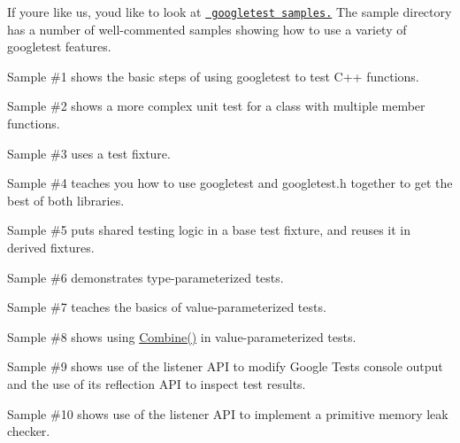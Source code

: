 If you\textquotesingle{}re like us, you\textquotesingle{}d like to look at \href{https://github.com/google/googletest/tree/master/googletest/samples}{\texttt{ googletest samples.}} The sample directory has a number of well-\/commented samples showing how to use a variety of googletest features.


\begin{DoxyItemize}
\item Sample \#1 shows the basic steps of using googletest to test C++ functions.
\item Sample \#2 shows a more complex unit test for a class with multiple member functions.
\item Sample \#3 uses a test fixture.
\item Sample \#4 teaches you how to use googletest and {\ttfamily googletest.\+h} together to get the best of both libraries.
\item Sample \#5 puts shared testing logic in a base test fixture, and reuses it in derived fixtures.
\item Sample \#6 demonstrates type-\/parameterized tests.
\item Sample \#7 teaches the basics of value-\/parameterized tests.
\item Sample \#8 shows using {\ttfamily \mbox{\hyperlink{namespacetesting_aa79138ff6a7f479fea4fed96a677f083}{Combine()}}} in value-\/parameterized tests.
\item Sample \#9 shows use of the listener A\+PI to modify Google Test\textquotesingle{}s console output and the use of its reflection A\+PI to inspect test results.
\item Sample \#10 shows use of the listener A\+PI to implement a primitive memory leak checker. 
\end{DoxyItemize}